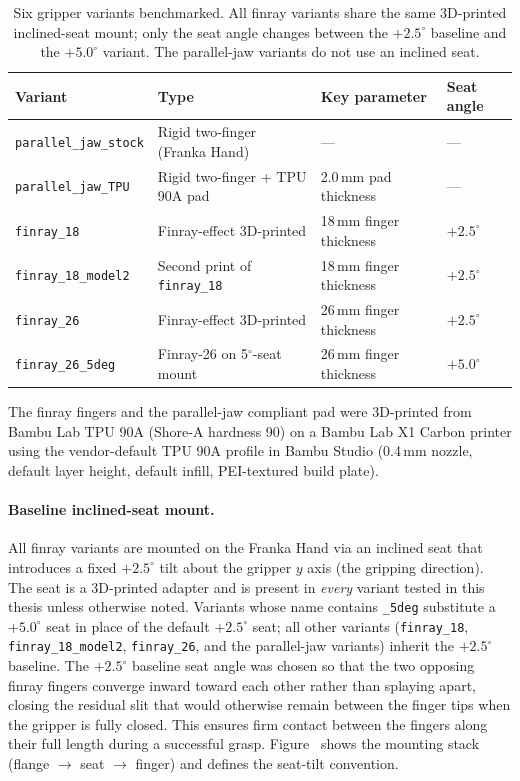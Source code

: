 \begin{table}[ht]
\centering
\caption[Gripper variants]{Six gripper variants benchmarked. All finray
variants share the same 3D-printed inclined-seat mount; only the seat
angle changes between the $+2.5^{\circ}$ baseline and the $+5.0^{\circ}$
variant. The parallel-jaw variants do not use an inclined seat.}
\label{tab:variants}
\begin{tabular}{llll}
\toprule
Variant & Type & Key parameter & Seat angle \\
\midrule
\texttt{parallel\_jaw\_stock}    & Rigid two-finger (Franka Hand)      & ---                    & --- \\
\texttt{parallel\_jaw\_TPU}      & Rigid two-finger + TPU 90A pad      & 2.0\,mm pad thickness  & --- \\
\texttt{finray\_18}              & Finray-effect 3D-printed            & 18\,mm finger thickness & $+2.5^{\circ}$ \\
\texttt{finray\_18\_model2}      & Second print of \texttt{finray\_18} & 18\,mm finger thickness & $+2.5^{\circ}$ \\
\texttt{finray\_26}              & Finray-effect 3D-printed            & 26\,mm finger thickness & $+2.5^{\circ}$ \\
\texttt{finray\_26\_5deg}        & Finray-26 on 5$^{\circ}$-seat mount & 26\,mm finger thickness & $+5.0^{\circ}$ \\
\bottomrule
\end{tabular}
\end{table}

The finray fingers and the parallel-jaw compliant pad were 3D-printed from
Bambu Lab TPU 90A (Shore-A hardness 90) on a Bambu Lab X1 Carbon printer
using the vendor-default TPU 90A profile in Bambu Studio (0.4\,mm nozzle,
default layer height, default infill, PEI-textured build plate).

\paragraph{Baseline inclined-seat mount.}
All finray variants are mounted on the Franka Hand via an inclined seat
that introduces a fixed $+2.5^{\circ}$ tilt about the gripper $y$ axis
(the gripping direction). The seat is a 3D-printed adapter and is
present in \emph{every} variant tested in this thesis unless otherwise
noted. Variants whose name contains \texttt{\_5deg} substitute a
$+5.0^{\circ}$ seat in place of the default $+2.5^{\circ}$ seat; all
other variants (\texttt{finray\_18}, \texttt{finray\_18\_model2},
\texttt{finray\_26}, and the parallel-jaw variants) inherit the
$+2.5^{\circ}$ baseline. The $+2.5^{\circ}$ baseline seat angle was chosen so that the two
opposing finray fingers converge inward toward each other rather than
splaying apart, closing the residual slit that would otherwise remain
between the finger tips when the gripper is fully closed. This ensures
firm contact between the fingers along their full length during a
successful grasp. Figure~ shows the mounting stack
(flange $\to$ seat $\to$ finger) and defines the seat-tilt convention.

